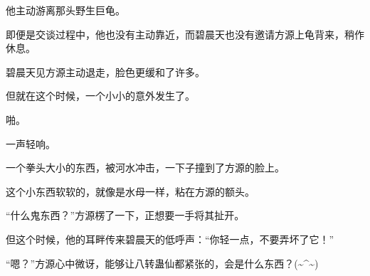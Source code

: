 \begin{this_body}
他主动游离那头野生巨龟。

即便是交谈过程中，他也没有主动靠近，而碧晨天也没有邀请方源上龟背来，稍作休息。

碧晨天见方源主动退走，脸色更缓和了许多。

但就在这个时候，一个小小的意外发生了。

啪。

一声轻响。

一个拳头大小的东西，被河水冲击，一下子撞到了方源的脸上。

这个小东西软软的，就像是水母一样，粘在方源的额头。

“什么鬼东西？”方源楞了一下，正想要一手将其扯开。

但这个时候，他的耳畔传来碧晨天的低呼声：“你轻一点，不要弄坏了它！”

“嗯？”方源心中微讶，能够让八转蛊仙都紧张的，会是什么东西？(\~{}\^{}\~{})

\end{this_body}


